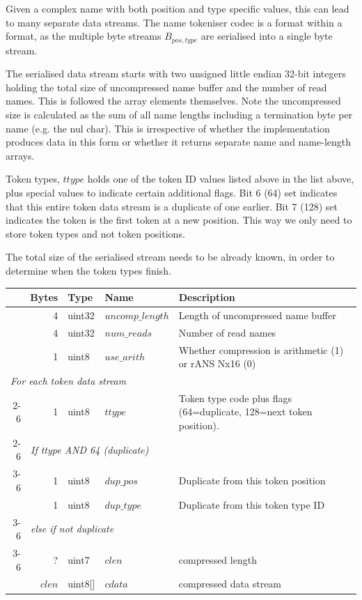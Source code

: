 \documentclass[a4paper]{article}
\begin{document}
Given a complex name with both position and type specific values, this
can lead to many separate data streams.  The name tokeniser codec is
a format within a format, as the multiple byte streams $B_{pos,type}$
are serialised into a single byte stream.

The serialised data stream starts with two unsigned little endian
32-bit integers holding the total size of uncompressed name buffer and
the number of read names.  This is followed the array elements
themselves.  Note the uncompressed size is calculated as the sum of
all name lengths including a termination byte per name (e.g. the nul
char).  This is irrespective of whether the implementation produces
data in this form or whether it returns separate name and name-length
arrays.

Token types, $ttype$ holds one of the token ID values listed above
in the list above, plus special values to indicate certain additional
flags.  Bit 6 (64) set indicates that this entire token data stream is a
duplicate of one earlier.  Bit 7 (128) set indicates the token
is the first token at a new position.  This way we only need to store
token types and not token positions.

The total size of the serialised stream needs to be already known, in
order to determine when the token types finish.

\begin{tabular}{|r|r|r|l|l|p{10cm}|}
\hline
\multicolumn{3}{|r|}{\textbf{Bytes}} & \textbf{Type} & \textbf{Name} & \textbf{Description}\\
\hline
\multicolumn{3}{|r|}{4} & uint32 & $uncomp\_length$ & Length of uncompressed name buffer\\
\multicolumn{3}{|r|}{4} & uint32 & $num\_reads$ & Number of read names\\
\multicolumn{3}{|r|}{1} & uint8  & $use\_arith$ & Whether compression is arithmetic (1) or rANS Nx16 (0)\\
\hline
\multicolumn{6}{|l|}{\quad\textit{For each token data stream}}\\
\cline{2-6}
& \multicolumn{2}{r|}{1} & uint8 & $ttype$ & Token type code plus flags (64=duplicate, 128=next token position).\\
\cline{2-6}
& \multicolumn{5}{l|}{\textit{If ttype AND 64 (duplicate)}}\\
\cline{3-6}
& & 1 & uint8 & $dup\_pos$  & Duplicate from this token position\\
& & 1 & uint8 & $dup\_type$ & Duplicate from this token type ID\\
\cline{3-6}
& \multicolumn{5}{l|}{\textit{else if not duplicate}}\\
\cline{3-6}
& & ? & uint7 & $clen$ & compressed length\\
& & $clen$ & uint8[] & $cdata$ & compressed data stream\\
\hline
\end{tabular}
\end{document}
